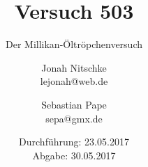 

\title{Versuch 503}
\subtitle{Der Millikan-Öltröpchenversuch}
\author{Jonah Nitschke\\
        lejonah@web.de \and
        Sebastian Pape\\
        sepa@gmx.de}
\date{Durchführung: 23.05.2017\\
      Abgabe: 30.05.2017}



\maketitle
\newpage
\setcounter{page}{1}


\newpage


\printbibliography


